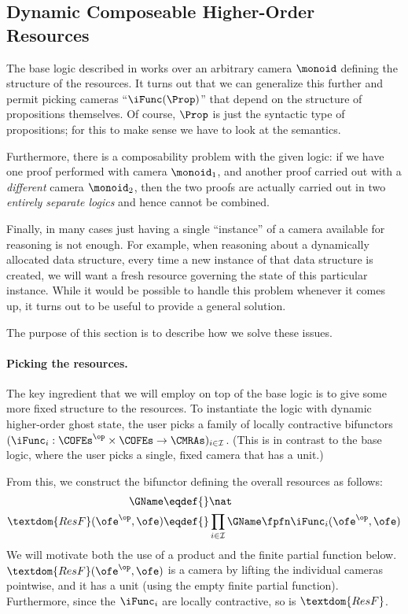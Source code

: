\subsection{Dynamic Composeable Higher-Order Resources}
\label{sec:composeable-resources}

The base logic described in  works over an arbitrary camera $\monoid$ defining the structure of the resources.
It turns out that we can generalize this further and permit picking cameras ``$\iFunc(\Prop)$'' that depend on the structure of propositions themselves.
Of course, $\Prop$ is just the syntactic type of propositions; for this to make sense we have to look at the semantics.

Furthermore, there is a composability problem with the given logic: if we have one proof performed with camera $\monoid_1$, and another proof carried out with a \emph{different} camera $\monoid_2$, then the two proofs are actually carried out in two \emph{entirely separate logics} and hence cannot be combined.

Finally, in many cases just having a single ``instance'' of a camera available for reasoning is not enough.
For example, when reasoning about a dynamically allocated data structure, every time a new instance of that data structure is created, we will want a fresh resource governing the state of this particular instance.
While it would be possible to handle this problem whenever it comes up, it turns out to be useful to provide a general solution.

The purpose of this section is to describe how we solve these issues.

\paragraph{Picking the resources.}
The key ingredient that we will employ on top of the base logic is to give some more fixed structure to the resources.
To instantiate the logic with dynamic higher-order ghost state, the user picks a family of locally contractive bifunctors $(\iFunc_i : \COFEs^\op \times \COFEs \to \CMRAs)_{i \in \mathcal{I}}$.
(This is in contrast to the base logic, where the user picks a single, fixed camera that has a unit.)

From this, we construct the bifunctor defining the overall resources as follows:
\begin{align*}
  \GName \eqdef{}& \nat \\
  \textdom{ResF}(\ofe^\op, \ofe) \eqdef{}& \prod_{i \in \mathcal I} \GName \fpfn \iFunc_i(\ofe^\op, \ofe)
\end{align*}
We will motivate both the use of a product and the finite partial function below.
$\textdom{ResF}(\ofe^\op, \ofe)$ is a camera by lifting the individual cameras pointwise, and it has a unit (using the empty finite partial function).
Furthermore, since the $\iFunc_i$ are locally contractive, so is $\textdom{ResF}$.

